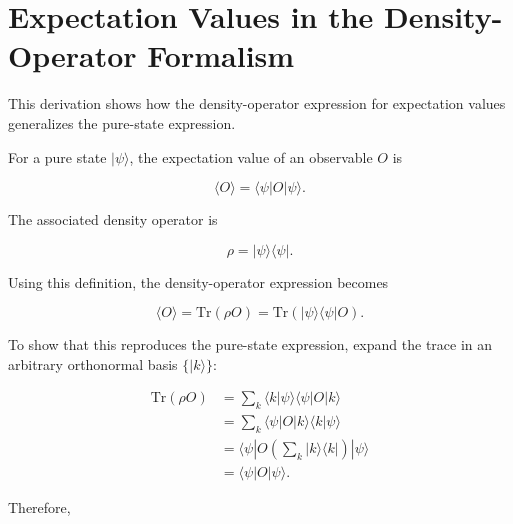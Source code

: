 
\section{Expectation Values in the Density-Operator Formalism}

This derivation shows how the density-operator expression for expectation values generalizes the pure-state expression.

\medskip

For a pure state \( |\psi\rangle \), the expectation value of an observable \( O \) is

\begin{equation}
\langle O \rangle
=
\langle \psi | O | \psi \rangle.
\label{eq:pure_state_expectation_derivation}
\end{equation}

The associated density operator is

\begin{equation}
\rho
=
|\psi\rangle \langle \psi |.
\label{eq:pure_state_density_operator_derivation}
\end{equation}

Using this definition, the density-operator expression becomes

\begin{equation}
\langle O \rangle
=
\mathrm{Tr}(\rho O)
=
\mathrm{Tr}
\left(
|\psi\rangle \langle \psi| O
\right).
\label{eq:density_expectation_trace_form}
\end{equation}

To show that this reproduces the pure-state expression, expand the trace in an arbitrary orthonormal basis \( \{|k\rangle\} \):

\begin{align}
\mathrm{Tr}(\rho O)
&=
\sum_k
\langle k |
\psi\rangle
\langle \psi |
O
| k \rangle
\nonumber
\\
&=
\sum_k
\langle \psi |
O
| k \rangle
\langle k |
\psi\rangle
\nonumber
\\
&=
\langle \psi |
O
\left(
\sum_k |k\rangle \langle k|
\right)
|\psi\rangle
\nonumber
\\
&=
\langle \psi | O | \psi \rangle.
\label{eq:density_expectation_pure_equivalence}
\end{align}

Therefore,

